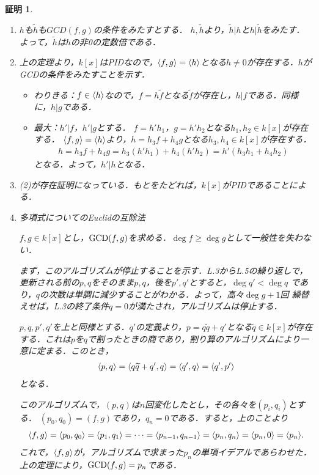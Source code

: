 \documentclass[9pt]{ltjsarticle}
\theoremstyle{break}
\theoremstyle{break}
\theoremstyle{break}
\theoremstyle{break}
\theoremstyle{break}
\theoremstyle{break}
\theoremstyle{break}
\theoremstyle{break}
\theoremstyle{break}
\theoremstyle{break}
\theoremstyle{break}
\theoremstyle{break}
\theoremstyle{break}
\theoremstyle{break}
\theoremstyle{break}
\theoremstyle{nonumberbreak}
\newtheorem{myproof}{証明}
\theoremstyle{nonumberbreak}
\begin{document}
\begin{myproof}
 \begin{enumerate}[label=(\arabic*)]
  \item
$h$も$\tilde h$も$GCD(f,g)$の条件をみたすとする．
$h,\tilde h$より，$\tilde h | h$と$h | \tilde h$をみたす．よって，$\tilde h$は$h$の非0の定数倍である．
  \item
上の定理より，$k[x]$はPIDなので，$\langle f,g \rangle=\langle h \rangle$となる$h\neq 0$が存在する．$h$がGCDの条件をみたすことを示す．
\begin{itemize}
 \item わりきる：$f\in \langle h \rangle$なので，$f=h\tilde f$となる$\tilde f$が存在し，$h|f$である．同様に，$h|g$である．
 \item 最大：$h'|f$，$h'|g$とする．
$f = h' h_1$，$g=h' h_2$となる$h_1,h_2 \in k[x]$が存在する．
$\langle f,g \rangle=\langle h \rangle$より，$h=h_3 f + h_4 g$となる$h_3,h_4 \in k[x]$が存在する．
\begin{align}
 h=h_3 f + h_4 g = h_3(h' h_1) + h_4(h' h_2) = h'(h_3 h_1 + h_4 h_2)
\end{align}
となる．よって，$h'|h$となる．
\end{itemize}
  \item (2)が存在証明になっている．もとをたどれば，$k[x]$がPIDであることによる．
  \item
\begin{algorithm}[H]
\caption{多項式についてのEuclidの互除法}
$f,g \in k[x]$とし，${\rm GCD}(f,g)$を求める．$\deg f \ge \deg g$として一般性を失わない．
 \begin{algorithmic}[1]
  \ENDWHILE
 \end{algorithmic}
\end{algorithm}
まず，このアルゴリズムが停止することを示す．L.3からL.5の繰り返しで，
更新される前の$p,q$をそのまま$p,q$，後を$p',q'$とすると，$\deg q' < \deg q$
であり，$q$の次数は単調に減少することがわかる．よって，高々$\deg g + 1$回
繰替えせば，L.3の終了条件$q = 0$が満たされ，アルゴリズムは停止する．

$p,q,p',q'$を上と同様とする．$q'$の定義より，$p=q\tilde q + q'$となる$\tilde q\in k[x]$が存在する．これは$p$を$q$で割ったときの商であり，割り算のアルゴリズムにより一意に定まる．このとき，
\begin{align}
 \langle p,q \rangle = \langle q\widetilde q + q', q \rangle = \langle q', q \rangle = \langle q', p' \rangle
\label{163222_28Feb15}
\end{align}
となる．

このアルゴリズムで，$(p,q)$は$n$回変化したとし，その各々を$(p_i,q_i)$とする．
$(p_0,q_0)=(f,g)$であり，$q_n = 0$である．すると，上のことより
\begin{align}
 \langle f,g \rangle = \langle p_0,q_0 \rangle = \langle p_1,q_1 \rangle = \dots = \langle p_{n-1},q_{n-1} \rangle = \langle p_n, q_n \rangle = \langle p_n, 0 \rangle = \langle p_n \rangle.
\end{align}
これで，$\langle f,g \rangle$が，アルゴリズムで求まった$p_n$の単項イデアルであらわせた．
上の定理により，${\rm GCD}(f,g)=p_n$である．
 \end{enumerate}
\end{myproof}
\end{document}
